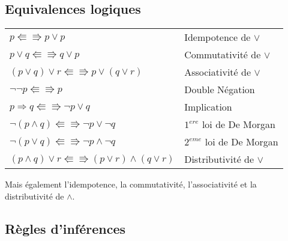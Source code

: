 \subsection{Equivalences logiques}
			\begin{center}
			\begin{tabular}{ll}
			$p \Lleftarrow \Rrightarrow p \lor p$ & Idempotence de $\lor$\\
			$p \lor q \Lleftarrow \Rrightarrow q \lor p$ & Commutativité de $\lor$\\
			$(p \lor q) \lor r \Lleftarrow \Rrightarrow p \lor (q \lor r)$ & Associativité de $\lor$\\
			$ \lnot \lnot p \Lleftarrow \Rrightarrow p$ & Double Négation\\
			$p \Rightarrow q \Lleftarrow \Rrightarrow \lnot p \lor q$ & Implication\\
			$\lnot (p \land q) \Lleftarrow \Rrightarrow \lnot p \lor \lnot q$ & $1^{ere}$ loi de De Morgan\\
			$\lnot (p \lor q) \Lleftarrow \Rrightarrow \lnot p \land \lnot q$ & $2^{eme}$ loi de De Morgan\\
			$(p \land q) \lor r \Lleftarrow \Rrightarrow (p \lor r) \land (q \lor r)$ & Distributivité de $\lor$\\
			\end{tabular}
			\end{center}
			Mais également l'idempotence, la commutativité, l'associativité et la distributivité de $\land$.\\
			
\subsection{Règles d'inférences}
		
